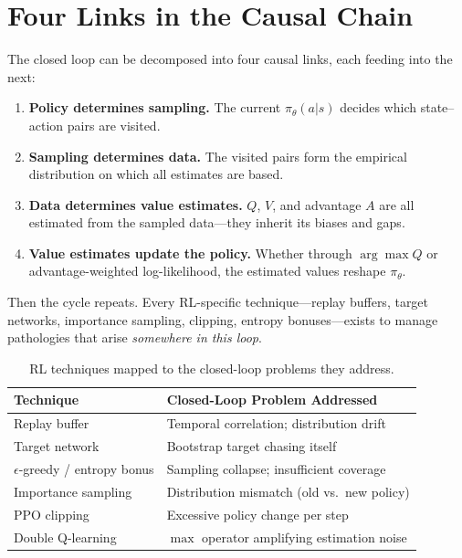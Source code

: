 \section{Four Links in the Causal Chain}
\label{sec:four-links}

The closed loop can be decomposed into four causal links, each feeding into the next:
%
\begin{enumerate}
    \item \textbf{Policy determines sampling.}
          The current $\pi_\theta(a|s)$ decides which state--action pairs are visited.
    \item \textbf{Sampling determines data.}
          The visited pairs form the empirical distribution on which all estimates are based.
    \item \textbf{Data determines value estimates.}
          $Q$, $V$, and advantage $A$ are all estimated from the sampled data---they inherit its biases and gaps.
    \item \textbf{Value estimates update the policy.}
          Whether through $\arg\max Q$ or advantage-weighted log-likelihood, the estimated values reshape $\pi_\theta$.
\end{enumerate}
%
Then the cycle repeats.
Every RL-specific technique---replay buffers, target networks, importance sampling, clipping, entropy bonuses---exists to manage pathologies that arise \emph{somewhere in this loop}.

\begin{table}[ht]
\centering
\caption{RL techniques mapped to the closed-loop problems they address.}
\label{tab:closed-loop-fixes}
\begin{tabular}{ll}
\toprule
\textbf{Technique} & \textbf{Closed-Loop Problem Addressed} \\
\midrule
Replay buffer       & Temporal correlation; distribution drift \\
Target network      & Bootstrap target chasing itself \\
$\epsilon$-greedy / entropy bonus & Sampling collapse; insufficient coverage \\
Importance sampling & Distribution mismatch (old vs.\ new policy) \\
PPO clipping        & Excessive policy change per step \\
Double Q-learning   & $\max$ operator amplifying estimation noise \\
\bottomrule
\end{tabular}
\end{table}

